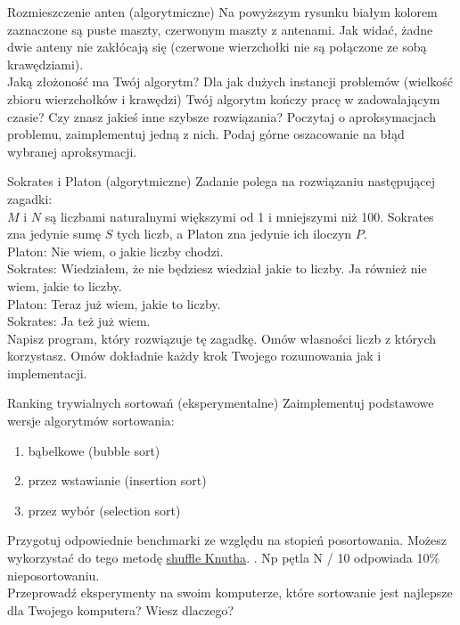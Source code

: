 \begin{exercise}{Rozmieszczenie anten (algorytmiczne)}{}
Na powyższym rysunku białym kolorem zaznaczone są puste maszty, czerwonym maszty z antenami. Jak widać, żadne dwie anteny nie zakłócają się (czerwone wierzchołki nie są połączone ze sobą krawędziami). \\

Jaką złożoność ma Twój algorytm? Dla jak dużych instancji problemów (wielkość zbioru wierzchołków i krawędzi) Twój algorytm kończy pracę w zadowalającym czasie? Czy znasz jakieś inne szybsze rozwiązania? Poczytaj o aproksymacjach problemu, zaimplementuj jedną z nich. Podaj górne oszacowanie na błąd wybranej aproksymacji.
\end{exercise}

\begin{exercise}{Sokrates i Platon (algorytmiczne)}{}
Zadanie polega na rozwiązaniu następującej zagadki: \\
$M$ i $N$ są liczbami naturalnymi większymi od 1 i mniejszymi niż 100. Sokrates zna jedynie sumę $S$ tych liczb, a Platon zna jedynie ich iloczyn $P$. \\

Platon: Nie wiem, o jakie liczby chodzi. \\
Sokrates: Wiedziałem, że nie będziesz wiedział jakie to liczby. Ja również nie wiem, jakie to liczby. \\
Platon: Teraz już wiem, jakie to liczby. \\
Sokrates: Ja też już wiem. \\

Napisz program, który rozwiązuje tę zagadkę. Omów własności liczb z których korzystasz. Omów dokładnie każdy krok Twojego rozumowania jak i implementacji.
\end{exercise}



\begin{exercise}{Ranking trywialnych sortowań (eksperymentalne)}{}
Zaimplementuj podstawowe wersje algorytmów sortowania:
\begin{enumerate}
    \item bąbelkowe (bubble sort)
    \item przez wstawianie (insertion sort)
    \item przez wybór (selection sort)
\end{enumerate}

Przygotuj odpowiednie benchmarki ze względu na stopień posortowania. Możesz wykorzystać do tego metodę \href{https://www.rosettacode.org/wiki/Knuth_shuffle}{shuffle Knutha}.
. Np pętla N / 10 odpowiada 10\% nieposortowaniu. \\

Przeprowadź eksperymenty na swoim komputerze, które sortowanie jest najlepsze dla Twojego komputera? Wiesz dlaczego?
\end{exercise}

